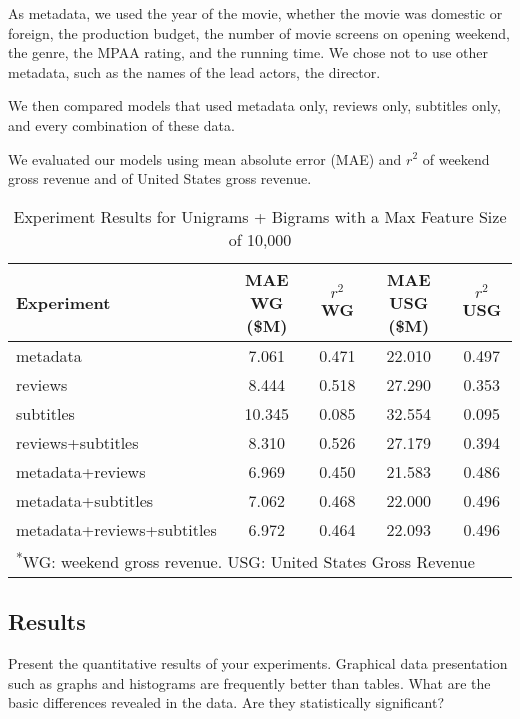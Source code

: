 \documentclass[11pt]{article}
\begin{document}
As metadata, we used the year
of the movie, whether the movie was domestic or foreign, the production budget,
the number of movie screens on opening weekend, the genre, the MPAA rating, and 
the running time. We chose not to use other metadata, such as the names of the lead actors,
the director.

We then compared models that used metadata only, reviews only, subtitles only, and every
combination of these data.

We evaluated our models using mean absolute error (MAE) and $r^2$ of weekend gross revenue
and of United States gross revenue. 
 

\begin{table*}[t]
\caption{Experiment Results for Unigrams + Bigrams with a Max Feature Size of 10,000}
\centering
\begin{tabular}{|l c c c c|}
  \hline
  \textbf{Experiment} & \textbf{MAE WG (\$M)} & \textbf{$r^2$ WG} & \textbf{MAE USG (\$M)}
  & \textbf{$r^2$ USG}\\
  \hline
  metadata                    &  7.061 &  0.471  & 22.010  & 0.497\\
  reviews                     &  8.444 &  0.518  & 27.290  & 0.353\\
  subtitles                   & 10.345 &  0.085  & 32.554  & 0.095\\
  reviews+subtitles           &  8.310 &  0.526  & 27.179  & 0.394\\
  metadata+reviews            &  6.969 &  0.450  & 21.583  & 0.486\\
  metadata+subtitles          &  7.062 &  0.468  & 22.000  & 0.496\\
  metadata+reviews+subtitles  &  6.972 &  0.464  & 22.093  & 0.496\\
  \hline
  \multicolumn{5}{l}{\textsuperscript{*}\footnotesize{WG: weekend gross revenue. USG:
  United States Gross Revenue}}
\end{tabular}
\end{table*}

\subsection{Results}
Present the quantitative results of your experiments. Graphical data presentation such as
graphs and histograms are frequently better than tables. What are the basic differences
revealed in the data. Are they statistically significant?
\end{document}
